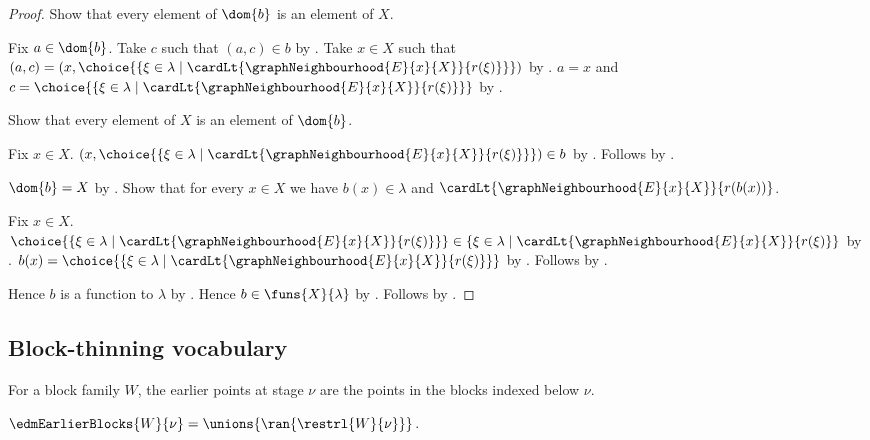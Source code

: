 \begin{proof}
    Show that every element of $\dom{b}$ is an element of $X$.
    \begin{subproof}
        Fix $a\in\dom{b}$.
        Take $c$ such that $(a,c)\in b$ by .
        Take $x\in X$ such that
            $(a,c)=(x,\choice{\{\xi\in\lambda\mid
                \cardLt{\graphNeighbourhood{E}{x}{X}}{r(\xi)}\}})$
            by .
        $a=x$ and $c=\choice{\{\xi\in\lambda\mid
            \cardLt{\graphNeighbourhood{E}{x}{X}}{r(\xi)}\}}$
            by .
    \end{subproof}
    Show that every element of $X$ is an element of $\dom{b}$.
    \begin{subproof}
        Fix $x\in X$.
        $(x,\choice{\{\xi\in\lambda\mid
            \cardLt{\graphNeighbourhood{E}{x}{X}}{r(\xi)}\}})\in b$
            by .
        Follows by .
    \end{subproof}
    $\dom{b}=X$ by .
    Show that for every $x\in X$ we have
        $b(x)\in\lambda$ and
        $\cardLt{\graphNeighbourhood{E}{x}{X}}{r(b(x))}$.
    \begin{subproof}
        Fix $x\in X$.
        $\choice{\{\xi\in\lambda\mid
            \cardLt{\graphNeighbourhood{E}{x}{X}}{r(\xi)}\}}
        \in\{\xi\in\lambda\mid
            \cardLt{\graphNeighbourhood{E}{x}{X}}{r(\xi)}\}$ by
            .
        $b(x)=\choice{\{\xi\in\lambda\mid
            \cardLt{\graphNeighbourhood{E}{x}{X}}{r(\xi)}\}}$ by
            .
        Follows by \auto.
    \end{subproof}
    Hence $b$ is a function to $\lambda$ by \auto.
    Hence $b\in\funs{X}{\lambda}$ by .
    Follows by \auto.
\end{proof}

\subsection{Block-thinning vocabulary}

For a block family $W$, the earlier points at stage $\nu$ are the points in
the blocks indexed below $\nu$.

\begin{definition}\label{edm_earlier_blocks}
    $\edmEarlierBlocks{W}{\nu}
        =\unions{\ran{\restrl{W}{\nu}}}$.
\end{definition}

